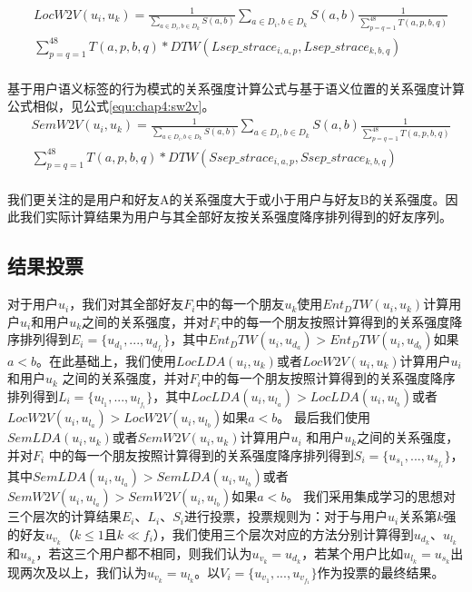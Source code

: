 \begin{equation}
\label{equ:chap4:lw2v}
\begin{split}
&LocW2V(u_{i},u_{k})=\frac{1}{\sum_{a\in D_{i},b\in D_{k}}S(a,b)}\sum_{a\in D_{i},b\in D_{k}}S(a,b)\frac{1}{\sum_{p=q=1}^{48}T(a,p,b,q)}\\
&\sum_{p=q=1}^{48}T(a,p,b,q)\ast DTW(Lsep\_strace_{i,a,p},Lsep\_strace_{k,b,q})\\
\end{split}
\end{equation}
\par 基于用户语义标签的行为模式的关系强度计算公式与基于语义位置的关系强度计算公式相似，见公式\ref{equ:chap4:sw2v}。
\begin{equation}
\label{equ:chap4:sw2v}
\begin{split}
&SemW2V(u_{i},u_{k})=\frac{1}{\sum_{a\in D_{i},b\in D_{k}}S(a,b)}\sum_{a\in D_{i},b\in D_{k}}S(a,b)\frac{1}{\sum_{p=q=1}^{48}T(a,p,b,q)}\\
&\sum_{p=q=1}^{48}T(a,p,b,q)\ast DTW(Ssep\_strace_{i,a,p},Ssep\_strace_{k,b,q})\\
\end{split}
\end{equation}
\par 我们更关注的是用户和好友A的关系强度大于或小于用户与好友B的关系强度。因此我们实际计算结果为用户与其全部好友按关系强度降序排列得到的好友序列。
\subsection{结果投票}
对于用户$u_{i}$，我们对其全部好友$F_{i}$中的每一个朋友$u_{k}$使用$Ent_DTW(u_{i},u_{k})$计算用户$u_{i}$和用户$u_{k}$之间的关系强度，并对$F_{i}$中的每一个朋友按照计算得到的关系强度降序排列得到$E_{i}=\{u_{d_{1}},...,u_{d_{f_{i}}}\}$，其中$Ent_DTW(u_{i},u_{d_{a}})>Ent_DTW(u_{i},u_{d_{b}})$如果$a<b$。在此基础上，我们使用$LocLDA(u_{i},u_{k})$或者$LocW2V(u_{i},u_{k})$计算用户$u_{i}$和用户$u_{k}$ 之间的关系强度，并对$F_{i}$中的每一个朋友按照计算得到的关系强度降序排列得到$L_{i}=\{u_{l_{1}},...,u_{l_{f_{i}}}\}$，其中$LocLDA(u_{i},u_{l_{a}})>LocLDA(u_{i},u_{l_{b}})$或者$LocW2V(u_{i},u_{l_{a}})>LocW2V(u_{i},u_{l_{b}})$如果$a<b$。 最后我们使用$SemLDA(u_{i},u_{k})$或者$SemW2V(u_{i},u_{k})$计算用户$u_{i}$ 和用户$u_{k}$之间的关系强度，并对$F_{i}$ 中的每一个朋友按照计算得到的关系强度降序排列得到$S_{i}=\{u_{s_{1}},...,u_{s_{f_{i}}}\}$，其中$SemLDA(u_{i},u_{l_{a}})>SemLDA(u_{i},u_{l_{b}})$或者$SemW2V(u_{i},u_{l_{a}})>SemW2V(u_{i},u_{l_{b}})$如果$a<b$。 我们采用集成学习的思想对三个层次的计算结果$E_{i}$、$L_{i}$、$S_{i}$进行投票，投票规则为：对于与用户$u_{i}$关系第$k$强的好友$u_{v_{k}}$（$k\leq 1$且$k\ll f_{i}$），我们使用三个层次对应的方法分别计算得到$u_{d_{k}}$、$u_{l_{k}}$ 和$u_{s_{k}}$，若这三个用户都不相同，则我们认为$u_{v_{k}}=u_{d_{k}}$，若某个用户比如$u_{l_{k}}=u_{s_{k}}$出现两次及以上，我们认为$u_{v_{k}}=u_{l_{k}}$。以$V_{i}=\{u_{v_{1}},...,u_{v_{f_{1}}}\}$作为投票的最终结果。
